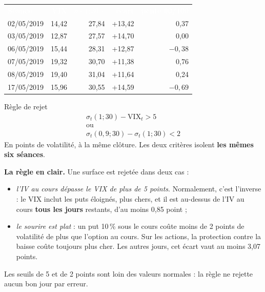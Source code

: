 \documentclass[10pt,a4paper]{article}
\newcommand{\entete}[1]{\textcolor{white}{\bfseries #1}}
\begin{document}
\begin{minipage}[t]{0.5\linewidth}\vspace{0pt}
{\small
\begin{tabular}{@{}l r r r r@{}}
\rowcolor{marine}\entete{Séance} & \entete{VIX} & \entete{$\sigma(1;30)$} & \entete{écart} & \entete{pente 90/100} \\
02/05/2019 & 14,42 & 27,84 & \textcolor{rouge}{+13,42} & 0,37 \\
\rowcolor{gris}03/05/2019 & 12,87 & 27,57 & \textcolor{rouge}{+14,70} & 0,00 \\
06/05/2019 & 15,44 & 28,31 & \textcolor{rouge}{+12,87} & $-0{,}38$ \\
\rowcolor{gris}07/05/2019 & 19,32 & 30,70 & \textcolor{rouge}{+11,38} & 0,76 \\
08/05/2019 & 19,40 & 31,04 & \textcolor{rouge}{+11,64} & 0,24 \\
\rowcolor{gris}17/05/2019 & 15,96 & 30,55 & \textcolor{rouge}{+14,59} & $-0{,}69$ \\
\end{tabular}}
\end{minipage}\hfill
\begin{minipage}[t]{0.47\linewidth}\vspace{0pt}
\begin{correction}{Règle de rejet}
\begin{equation}\label{eq:rejet}
\begin{gathered}
\sigma_t(1;30)-\mathrm{VIX}_t>5\\[-1pt]
\text{ou}\\[-1pt]
\sigma_t(0{,}9;30)-\sigma_t(1;30)<2
\end{gathered}
\end{equation}
En points de volatilité, à la même clôture. Les deux critères isolent \textbf{les mêmes six séances}.
\end{correction}
\end{minipage}

\textbf{La règle en clair.} Une surface est rejetée dans deux cas :
\begin{itemize}[nosep,leftmargin=*]
  \item \emph{l'IV au cours dépasse le VIX de plus de 5 points}. Normalement, c'est l'inverse : le VIX inclut les puts éloignés, plus chers, et il est au-dessus de l'IV au cours \textbf{tous les jours} restants, d'au moins 0,85 point ;
  \item \emph{le sourire est plat} : un put 10\,\% sous le cours coûte moins de 2 points de volatilité de plus que l'option au cours. Sur les actions, la protection contre la baisse coûte toujours plus cher. Les autres jours, cet écart vaut au moins 3,07 points.
\end{itemize}
Les seuils de 5 et de 2 points sont loin des valeurs normales : la règle ne rejette aucun bon jour par erreur.
\end{document}
